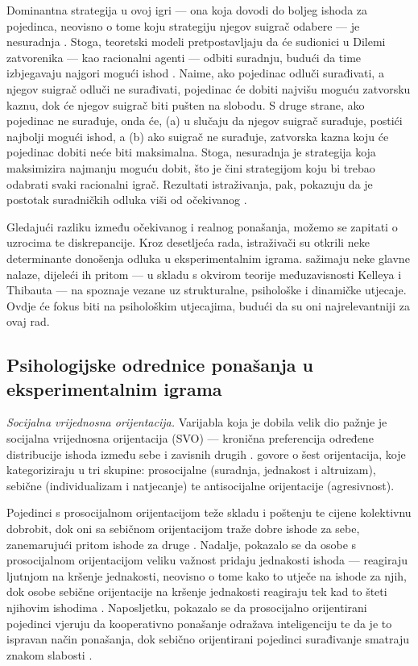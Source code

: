 \documentclass[a4paper, 12pt]{report}
\begin{document}
Dominantna strategija u ovoj igri --- ona koja dovodi do boljeg ishoda za
pojedinca, neovisno o tome koju strategiju njegov suigrač odabere --- je
nesuradnja \citep{colgt}. Stoga, teoretski modeli pretpostavljaju da će sudionici u
Dilemi zatvorenika --- kao racionalni agenti --- odbiti suradnju, budući da time
izbjegavaju najgori mogući ishod \citep{worldexgame}. Naime, ako pojedinac
odluči surađivati, a njegov suigrač odluči ne surađivati, pojedinac će dobiti
najvišu moguću zatvorsku kaznu, dok će njegov suigrač biti pušten na slobodu. S
druge strane, ako pojedinac ne surađuje, onda će, (a) u slučaju da njegov suigrač
surađuje, postići najbolji mogući ishod, a (b) ako suigrač ne surađuje, zatvorska
kazna koju će pojedinac dobiti neće biti maksimalna. Stoga, nesuradnja je
strategija koja maksimizira najmanju moguću dobit, što je čini strategijom koju
bi trebao odabrati svaki racionalni igrač. 
Rezultati istraživanja,
pak, pokazuju da je postotak suradničkih odluka viši od očekivanog \citep{colgt,
    worldexgame, jones2008smarter, shafir1992thinking}.

Gledajući razliku između očekivanog i realnog ponašanja, možemo se zapitati o
uzrocima te diskrepancije. Kroz desetljeća rada, istraživači su otkrili neke
determinante donošenja odluka u eksperimentalnim igrama. 
 sažimaju neke glavne nalaze, dijeleći ih pritom --- u skladu
s  okvirom teorije međuzavisnosti Kelleya i Thibauta \citeyearpar{kelthibinterp} --- na
spoznaje vezane uz strukturalne, psihološke i dinamičke utjecaje.
Ovdje će fokus biti na psihološkim utjecajima, budući da su oni
najrelevantniji za ovaj rad.

\subsection{Psihologijske odrednice ponašanja u eksperimentalnim igrama}

\textit{Socijalna vrijednosna orijentacija.} Varijabla koja je dobila velik
dio pažnje je socijalna vrijednosna orijentacija (SVO)
\citep{messicksov,vanpursuit} --- kronična preferencija određene distribucije
ishoda između sebe i zavisnih drugih \citep{handdedreu}. \citet{krugsochand}
govore o šest orijentacija, koje
kategoriziraju u tri skupine: prosocijalne  (suradnja, jednakost i
altruizam), sebične (individualizam i
natjecanje) te antisocijalne orijentacije (agresivnost). 

Pojedinci s prosocijalnom orijentacijom teže skladu i poštenju te cijene
kolektivnu dobrobit, dok oni sa sebičnom orijentacijom traže dobre ishode za
sebe, zanemarujući pritom ishode za druge \citep{handdedreu}. Nadalje,
pokazalo se da osobe s prosocijalnom orijentacijom veliku važnost pridaju
jednakosti ishoda --- reagiraju ljutnjom na kršenje jednakosti, neovisno o tome
kako to utječe na ishode za njih, dok osobe sebične orijentacije na kršenje
jednakosti reagiraju tek kad to šteti njihovim ishodima \citep{vancoop}.
Naposljetku, pokazalo se da prosocijalno orijentirani pojedinci vjeruju da
kooperativno ponašanje odražava inteligenciju te da je to ispravan način
ponašanja, dok sebično orijentirani pojedinci surađivanje smatraju znakom
slabosti
\citep*{liebrand1986might,mcclintock1988role,langelieb91,van1990causal}.
\end{document}
